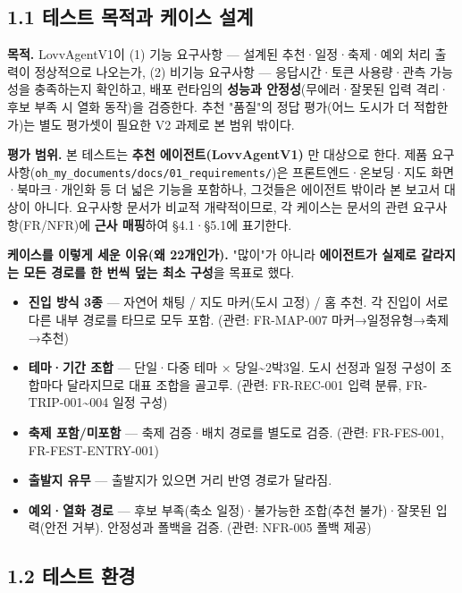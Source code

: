 \documentclass[11pt,a4paper]{article}
\newcommand{\DocNeedspace}[1]{\par\ifdim\dimexpr\pagegoal-\pagetotal\relax<#1\newpage\fi}
\providecommand{\tightlist}{\setlength{\itemsep}{0pt}\setlength{\parskip}{0pt}}
\begin{document}
\DocNeedspace{6\baselineskip}
\subsection*{1.1 테스트 목적과 케이스 설계}

\textbf{목적.} LovvAgentV1이 (1) 기능 요구사항 --- 설계된 추천·일정·축제·예외 처리 출력이 정상적으로 나오는가, (2) 비기능 요구사항 --- 응답시간·토큰 사용량·관측 가능성을 충족하는지 확인하고, 배포 런타임의 \textbf{성능과 안정성}(무에러·잘못된 입력 격리·후보 부족 시 열화 동작)을 검증한다. 추천 "품질"의 정답 평가(어느 도시가 더 적합한가)는 별도 평가셋이 필요한 V2 과제로 본 범위 밖이다.

\textbf{평가 범위.} 본 테스트는 \textbf{추천 에이전트(LovvAgentV1)} 만 대상으로 한다. 제품 요구사항(\texttt{oh\_\allowbreak{}my\_\allowbreak{}documents/\allowbreak{}docs/\allowbreak{}01\_\allowbreak{}requirements/\allowbreak{}})은 프론트엔드·온보딩·지도 화면·북마크·개인화 등 더 넓은 기능을 포함하나, 그것들은 에이전트 밖이라 본 보고서 대상이 아니다. 요구사항 문서가 비교적 개략적이므로, 각 케이스는 문서의 관련 요구사항(FR/NFR)에 \textbf{근사 매핑}하여 §4.1·§5.1에 표기한다.

\textbf{케이스를 이렇게 세운 이유(왜 22개인가).} "많이"가 아니라 \textbf{에이전트가 실제로 갈라지는 모든 경로를 한 번씩 덮는 최소 구성}을 목표로 했다.

\begin{itemize}
\tightlist
\item
  \textbf{진입 방식 3종} --- 자연어 채팅 / 지도 마커(도시 고정) / 홈 추천. 각 진입이 서로 다른 내부 경로를 타므로 모두 포함. (관련: FR-MAP-007 마커→일정유형→축제→추천)
\item
  \textbf{테마·기간 조합} --- 단일·다중 테마 × 당일\textasciitilde{}2박3일. 도시 선정과 일정 구성이 조합마다 달라지므로 대표 조합을 골고루. (관련: FR-REC-001 입력 분류, FR-TRIP-001\textasciitilde004 일정 구성)
\item
  \textbf{축제 포함/미포함} --- 축제 검증·배치 경로를 별도로 검증. (관련: FR-FES-001, FR-FEST-ENTRY-001)
\item
  \textbf{출발지 유무} --- 출발지가 있으면 거리 반영 경로가 달라짐.
\item
  \textbf{예외·열화 경로} --- 후보 부족(축소 일정)·불가능한 조합(추천 불가)·잘못된 입력(안전 거부). 안정성과 폴백을 검증. (관련: NFR-005 폴백 제공)
\end{itemize}

\DocNeedspace{6\baselineskip}
\subsection*{1.2 테스트 환경}
\end{document}
